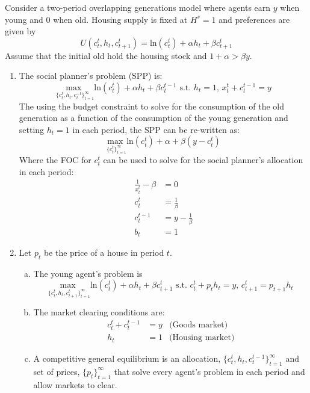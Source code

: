 \documentclass{article}
\newcommand{\loge}[1]{\text{ln}\left(#1\right)}
\newcommand{\usmax}[1]{\underset{#1}{\text{max }}}
\begin{document}
\noindent Consider a two-period overlapping generations model where agents earn $y$ when young and $0$ when old. Housing supply is fixed at $H^s=1$ and preferences are given by 
\[
	U(c_t^t,h_t,c_{t+1}^t) = \loge{c_t^t} + \alpha h_t + \beta c_{t+1}^t 
\]
Assume that the initial old hold the housing stock and $1+\alpha > \beta y$.
\begin{enumerate}
	\item The social planner's problem (SPP) is:
		\[
			\usmax{\{c_t^t,h_t,c^{-t}_t\}^\infty_{t=1}}\loge{c_t^t} + \alpha h_t + \beta c^{t-1}_t \text{ s.t. } h_t=1\text{, }x_t^t+c_t^{t-1}=y
		\]
		The using the budget constraint to solve for the consumption of the old generation as a function of the consumption of the young generation and setting $h_t=1$ in each period, the SPP can be re-written as:
		\[
			\usmax{\{c_t^t\}^\infty_{t=1}}\loge{c_t^t} + \alpha + \beta (y-c_t^t)
		\]
		Where the FOC for $c_t^t$ can be used to solve for the social planner's allocation in each period:
		\begin{align*}
			\frac{1}{x_t^t}-\beta &= 0	\\
			c_t^t &= \frac{1}{\beta}	\\
			c_t^{t-1} &= y-\frac{1}{\beta}	\\
			b_t &= 1
		\end{align*}
		
	\pagebreak	
	\item Let $p_t$ be the price of a house in period $t$.
		\begin{enumerate}[(a)]
			\item The young agent's problem is 
				\[
					\usmax{\{c_t^t,h_t,c_{t+1}^t\}^\infty_{t=1}}\loge{c_t^t} + \alpha h_t + \beta c_{t+1}^t \text{ s.t. } c_t^t + p_th_t = y\text{, }c_{t+1}^t = p_{t+1}h_t
				\]
				
			\item The market clearing conditions are:
				\begin{align*}
					c_t^t + c_t^{t-1} 	&= y &\text{(Goods market)} 	\\
								h_t 	&= 1 &\text{(Housing market)} 
				\end{align*}
			
			\item A competitive general equilibrium is an allocation, $\{c_t^t,h_t,c_t^{t-1}\}_{t=1}^\infty$ and set of prices, $\{p_t\}_{t=1}^\infty$ that solve every agent's problem in each period and allow markets to clear.
			

\end{enumerate}
\end{enumerate}
\end{document}
